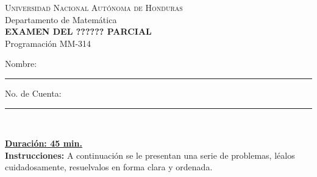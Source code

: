 \documentclass[letterpaper]{examdesign}
\begin{document}
\begin{examtop}
\begin{center}
  \Large \textsc{Universidad Nacional Autónoma de Honduras}\\
  \large Departamento de Matemática\\
  \textbf{EXAMEN DEL ?????? PARCIAL} \\%
  Programación MM-314\\
  \begin{flushleft}
  Nombre: \rule{0.4\textwidth}{.4pt}
  No. de Cuenta: \rule{0.2\textwidth}{.4pt}\\
  \end{flushleft}
\end{center}
\underline{\textbf{Duración: 45 min.}}\\[0.3cm]
\textbf{Instrucciones:} A continuación se le presentan una serie de problemas, léalos cuidadosamente, resuelvalos en forma clara y ordenada.
\end{examtop}

\end{document}
